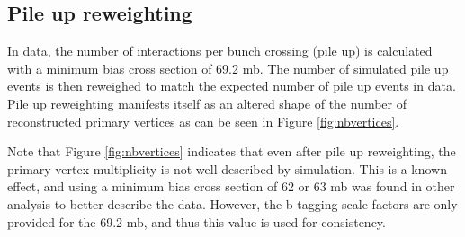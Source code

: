 \subsection*{Pile up reweighting}
In data, the number of interactions per bunch crossing (pile up) is calculated with a minimum bias cross section of 69.2 mb. The number of simulated pile up events is then reweighed to match the expected number of pile up events in data. Pile up reweighting manifests itself as an altered shape of the number of reconstructed primary vertices as can be seen in Figure \ref{fig:nbvertices}.
%

Note that Figure \ref{fig:nbvertices} indicates that even after pile up reweighting, the primary vertex multiplicity is not well described by simulation. This is a known effect, and using  a minimum bias cross section of 62 or 63 mb was found in other analysis to better describe the data. However, the b tagging scale factors are only provided for the 69.2 mb, and thus this value is used for consistency.


